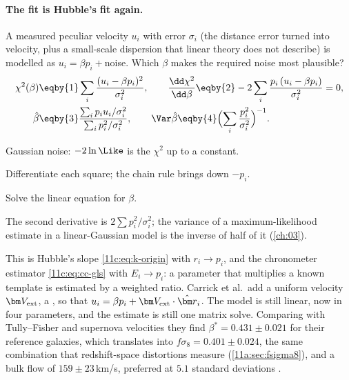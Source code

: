 \paragraph{The fit is Hubble's fit again.} A measured peculiar velocity $u_i$ with
error $\sigma_i$ (the distance error turned into velocity, plus a small-scale
dispersion that linear theory does not describe) is modelled as $u_i=\beta p_i+$noise.
Which $\beta$ makes the required noise most plausible?
\begin{align}
  \chi^2(\beta)
  &\eqby{1}\sum_i\frac{(u_i-\beta p_i)^2}{\sigma_i^2},
  \qquad
  \frac{\dd\chi^2}{\dd\beta}\eqby{2}-2\sum_i\frac{p_i\,(u_i-\beta p_i)}{\sigma_i^2}=0,
  \nonumber\\
  \hat\beta
  &\eqby{3}\frac{\sum_ip_iu_i/\sigma_i^2}{\sum_ip_i^2/\sigma_i^2},
  \qquad
  \Var\hat\beta\eqby{4}\Bigl(\sum_i\frac{p_i^2}{\sigma_i^2}\Bigr)^{-1}.
  \label{11c:eq:beta-hat}
\end{align}
\begin{explain}
  \item Gaussian noise: $-2\ln\Like$ is the $\chi^2$ up to a constant.
  \item Differentiate each square; the chain rule brings down $-p_i$.
  \item Solve the linear equation for $\beta$.
  \item The second derivative is $2\sum p_i^2/\sigma_i^2$; the variance of a
        maximum-likelihood estimate in a linear-Gaussian model is the inverse of half
        of it (\cref{ch:03}).
\end{explain}
This is Hubble's slope \eqref{11c:eq:k-origin} with $r_i\to p_i$, and the chronometer
estimator \eqref{11c:eq:cc-gls} with $E_i\to p_i$: a parameter that multiplies a known
template is estimated by a weighted ratio. Carrick et al.\ add a uniform velocity
$\bm V_{\rm ext}$, a  , so that $u_i=\beta p_i+\bm V_{\rm ext}\cdot\hat{\bm r}_i$.
The model is still linear, now in four parameters, and the estimate is still one
matrix solve. Comparing with Tully--Fisher and supernova velocities they find
$\beta^*=0.431\pm0.021$ for their reference galaxies, which translates into
$f\sigma_8=0.401\pm0.024$, the same combination that redshift-space distortions measure
(\cref{11a:sec:fsigma8}), and a bulk flow of $159\pm23$\,km/s, preferred at $5.1$
standard deviations \cite{Carrick2015}.

